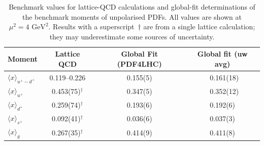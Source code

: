 \begin{table}[!t]
\centering
\renewcommand{\arraystretch}{1.2}
\begin{tabular}{lccc}
\toprule
Moment & Lattice QCD & Global Fit (PDF4LHC) & Global fit (uw avg)\\
\midrule
$\langle x \rangle_{u^+ -d^+}$ 
& \numrange{0.119}{0.226} 
& 0.155(5)
& \, 0.161(18)\\
$\langle x \rangle_{u^+}$     
& 0.453(75)$^\dagger$ 
& 0.347(5)
& \, 0.352(12)\\
$\langle x \rangle_{d^+}$     
& 0.259(74)$^\dagger$ 
& 0.193(6)
& 0.192(6)\\
$\langle x \rangle_{s^+}$     
& 0.092(41)$^\dagger$ 
& 0.036(6)
& 0.037(3)\\
$\langle x\rangle_{g}$       
& 0.267(35)$^\dagger$ 
& 0.414(9)
& 0.411(8)\\
\bottomrule
\end{tabular}
\caption{\small Benchmark values for lattice-QCD calculations and global-fit 
determinations of the benchmark moments of unpolarised PDFs.
%
All values are shown at $\mu^2=4\mbox{ GeV}^2$.
%
Results with a superscript~$\dagger$ are from a single lattice 
calculation; they may underestimate some sources of uncertainty.}
\label{tab:BMunp}
\end{table}

